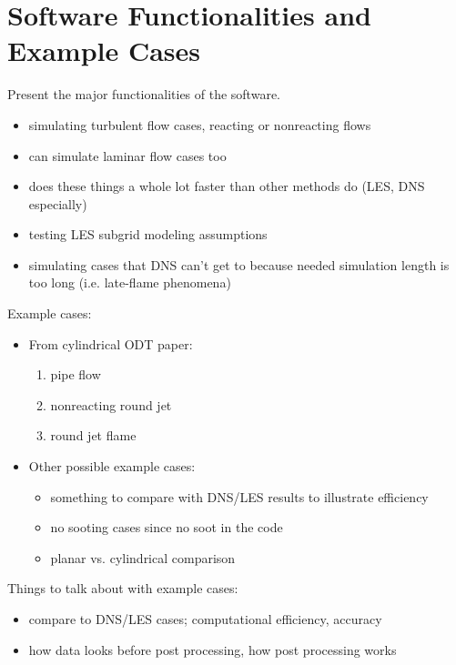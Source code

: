 \documentclass[preprint,12pt, a4paper]{elsarticle}
\begin{document}

\section{Software Functionalities and Example Cases}
\label{sec:examples}

Present the major functionalities of the software. 
\begin{itemize}
	\item simulating turbulent flow cases, reacting or nonreacting flows
	\item can simulate laminar flow cases too
	\item does these things a whole lot faster than other methods do (LES, DNS especially)
	\item testing LES subgrid modeling assumptions
	\item simulating cases that DNS can't get to because needed simulation length is too long (i.e. late-flame phenomena)
\end{itemize}

Example cases:
\begin{itemize}
	\item From cylindrical ODT paper:
	\begin{enumerate}
		\item pipe flow
		\item nonreacting round jet
		\item round jet flame
	\end{enumerate}
	\item Other possible example cases:
	\begin{itemize}
		\item something to compare with DNS/LES results to illustrate efficiency
		\item no sooting cases since no soot in the code
		\item planar vs. cylindrical comparison
	\end{itemize}
\end{itemize} 

Things to talk about with example cases:
\begin{itemize}
	\item compare to DNS/LES cases; computational efficiency, accuracy
	\item how data looks before post processing, how post processing works
\end{itemize}
\end{document}
